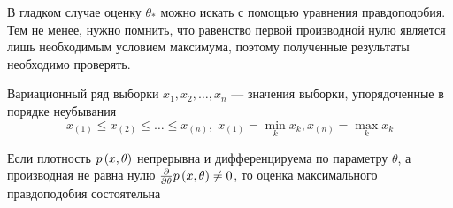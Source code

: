 \begin{remark}
    В гладком случае оценку $\theta_*$ можно искать
    с помощью уравнения правдоподобия.
    Тем не менее, нужно помнить, что равенство первой производной нулю
    является лишь необходимым условием максимума,
    поэтому полученные результаты необходимо проверять.
\end{remark}

\begin{definition}
    Вариационный ряд выборки $x_1, x_2, \dots, x_n$ --- значения выборки,
    упорядоченные в порядке неубывания
    $$x_{\left(1\right)} \le x_{\left(2\right)} \le \dots
        \le x_{\left(n\right)},\;
        x_{\left(1\right)}=\underset{k}\min{x_k},
        x_{\left(n\right)}=\underset{k}\max{x_k}$$
\end{definition}

\begin{theorem}
    Если плотность $p\left(x,\theta\right)$
    непрерывна и дифференцируема по параметру $\theta$,
    а производная не равна нулю
    $\frac{\partial}{\partial\theta}p\left(x,\theta\right)\neq 0$,
    то оценка максимального правдоподобия состоятельна
\end{theorem}
